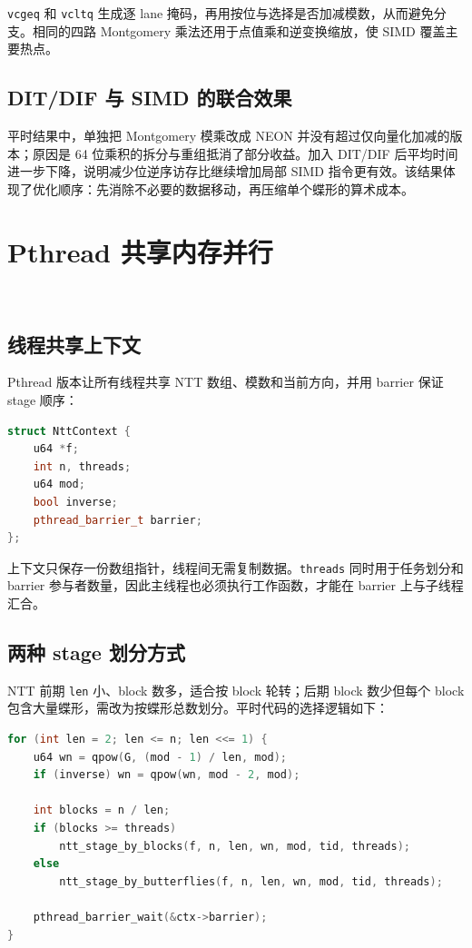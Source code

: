 \texttt{vcgeq} 和 \texttt{vcltq} 生成逐 lane 掩码，再用按位与选择是否加减模数，从而避免分支。相同的四路 Montgomery 乘法还用于点值乘和逆变换缩放，使 SIMD 覆盖主要热点。

\subsection{DIT/DIF 与 SIMD 的联合效果}

平时结果中，单独把 Montgomery 模乘改成 NEON 并没有超过仅向量化加减的版本；原因是 64 位乘积的拆分与重组抵消了部分收益。加入 DIT/DIF 后平均时间进一步下降，说明减少位逆序访存比继续增加局部 SIMD 指令更有效。该结果体现了优化顺序：先消除不必要的数据移动，再压缩单个蝶形的算术成本。

\section{Pthread 共享内存并行}\oldwork\ \fusionwork

\subsection{线程共享上下文}

Pthread 版本让所有线程共享 NTT 数组、模数和当前方向，并用 barrier 保证 stage 顺序：

\begin{lstlisting}[title=Pthread NTT共享上下文,label={lst:pthread-context},language={C++}]
struct NttContext {
    u64 *f;
    int n, threads;
    u64 mod;
    bool inverse;
    pthread_barrier_t barrier;
};
\end{lstlisting}

上下文只保存一份数组指针，线程间无需复制数据。\texttt{threads} 同时用于任务划分和 barrier 参与者数量，因此主线程也必须执行工作函数，才能在 barrier 上与子线程汇合。

\subsection{两种 stage 划分方式}

NTT 前期 \texttt{len} 小、block 数多，适合按 block 轮转；后期 block 数少但每个 block 包含大量蝶形，需改为按蝶形总数划分。平时代码的选择逻辑如下：

\begin{lstlisting}[title=根据stage形态切换Pthread粒度,label={lst:pthread-grain},language={C++}]
for (int len = 2; len <= n; len <<= 1) {
    u64 wn = qpow(G, (mod - 1) / len, mod);
    if (inverse) wn = qpow(wn, mod - 2, mod);

    int blocks = n / len;
    if (blocks >= threads)
        ntt_stage_by_blocks(f, n, len, wn, mod, tid, threads);
    else
        ntt_stage_by_butterflies(f, n, len, wn, mod, tid, threads);

    pthread_barrier_wait(&ctx->barrier);
}
\end{lstlisting}

